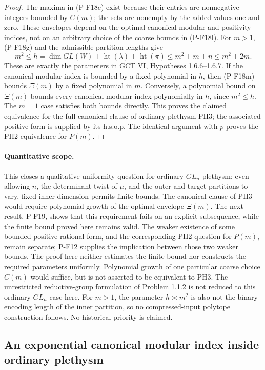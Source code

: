 \documentclass[11pt,a4paper]{article}
\begin{document}
\begin{proof}
The maxima in (P-F18c) exist because their entries are nonnegative
integers bounded by $C(m)$; the sets are nonempty by the added
values one and zero. These envelopes depend on the optimal
canonical modular and positivity indices, not on an arbitrary
choice of the coarse bounds in (P-F18l).
For $m>1$, (P-F18g) and the admissible partition lengths give
\[
 m^2\le
 h=\dim GL(W)+\operatorname{ht}(\lambda)+\operatorname{ht}(\pi)
 \le m^2+m+n\le m^2+2m.
 \tag{P-F18m}
\]
These are exactly the parameters in GCT VI, Hypotheses 1.6.6--1.6.7.
If the canonical modular index is bounded by a fixed polynomial in
$h$, then (P-F18m) bounds $\Xi(m)$ by a fixed polynomial in $m$.
Conversely, a polynomial bound on $\Xi(m)$ bounds every canonical
modular index polynomially in $h$, since $m^2\le h$.
The $m=1$ case satisfies both bounds directly. This proves the
claimed equivalence for the full canonical clause of ordinary
plethysm PH3; the associated positive form is supplied by its
h.s.o.p. The identical argument with $p$ proves the PH2 equivalence
for $P(m)$.
\end{proof}

\paragraph{Quantitative scope.}
This closes a qualitative uniformity question for ordinary
$GL_n$ plethysm: even allowing $n$, the determinant twist of $\mu$,
and the outer and target partitions to vary, fixed inner dimension
permits finite bounds. The canonical clause of PH3 would require
polynomial growth of the optimal envelope $\Xi(m)$. The next
result, P-F19, shows that this requirement fails on an explicit
subsequence, while the finite bound proved here remains valid.
The weaker existence of some bounded positive rational form, and
the corresponding PH2 question for $P(m)$, remain separate;
P-F12 supplies the implication between those two weaker bounds.
The proof here neither estimates the finite bound nor constructs
the required parameters uniformly. Polynomial growth of one particular coarse choice
$C(m)$ would suffice, but is not asserted to be equivalent to PH3.
The unrestricted reductive-group formulation of Problem 1.1.2 is
not reduced to this ordinary $GL_n$ case here. For $m>1$, the parameter
$h\asymp m^2$ is also not the binary encoding length of the inner
partition, so no compressed-input polytope construction follows.
No historical priority is claimed.


\subsection{An exponential canonical modular index inside ordinary plethysm}
\end{document}

